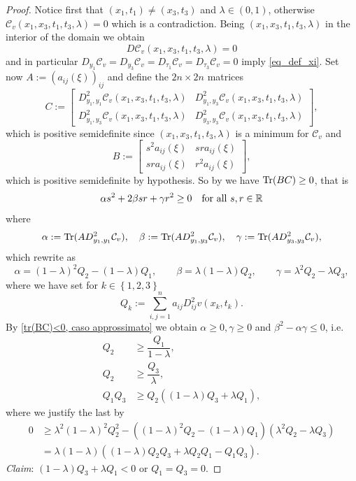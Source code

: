 \documentclass[11pt, reqno]{amsart}
\theoremstyle{definition}
\numberwithin{equation}{section}
\newcommand{\R}{\mathbb{R}}
\newcommand{\Tr}{{\rm Tr}}
\begin{document}
\begin{proof}
Notice first that $(x_1,t_1)\ne (x_3,t_3)$ and $\lambda\in (0,1)$, otherwise $\mathcal{C}_v(x_1,x_3,t_1,t_3,\lambda)=0$ which is a contradiction. 
Being $(x_1,x_3,t_1,t_3,\lambda)$ in the interior of the domain we obtain
			\[ D\mathcal{C}_v(x_1,x_3,t_1,t_3,\lambda)=0 \]
		and in particular $D_{y_1}\mathcal{C}_v = D_{y_3}\mathcal{C}_v = D_{\tau_1}\mathcal{C}_v = D_{\tau_3}\mathcal{C}_v = 0$ imply \eqref{eq_def_xi}. 
		Set now $A:=(a_{ij}(\xi))_{ij}$ and define the $2n\times 2n$ matrices 
		\[ C:= 
		\begin{bmatrix}
			D^2_{y_1, y_1}\mathcal{C}_v(x_1,x_3, t_1,t_3,\lambda) & 	 D^2_{y_1, y_3}\mathcal{C}_v(x_1,x_3, t_1,t_3,\lambda)\\
			D^2_{y_1, y_3}\mathcal{C}_v(x_1,x_3, t_1,t_3,\lambda) & 	 D^2_{y_3, y_3}\mathcal{C}_v(x_1,x_3, t_1,t_3,\lambda)
		\end{bmatrix}, \]
		which is positive semidefinite since $(x_1,x_3, t_1,t_3,\lambda)$ is a minimum for $\mathcal{C}_v$ and 
		\[ B:= \begin{bmatrix}
			s^2a_{ij}(\xi) & sra_{ij}(\xi) \\
			sra_{ij}(\xi) & r^2a_{ij}(\xi) 
		\end{bmatrix}, \]
		which is positive semidefinite by hypothesis. So by \cite[Lemma A.1]{kennington} we have $\Tr(BC)\geq 0$, that is
		\begin{equation}\label{tr(BC)<0, caso approssimato}
			\alpha s^2 +2\beta sr +\gamma r^2\geq 0 \quad \hbox{for all $s,r\in \R$} 
		\end{equation}
		where 
		\[ \alpha := \Tr (AD^2_{y_1,y_1}\mathcal{C}_v), \quad \beta:= \Tr (AD^2_{y_1,y_3}\mathcal{C}_v),\quad \gamma:= \Tr (AD^2_{y_3,y_3}\mathcal{C}_v),\]
		which rewrite as 
$$
				\alpha =(1-\lambda)^2Q_2-(1-\lambda)Q_1, \qquad \beta= \lambda(1-\lambda)Q_2, \qquad \gamma= \lambda^2Q_2-\lambda Q_3, 
$$
		where we have set for $k\in\left\{1,2,3\right\}$
		\[ Q_k:=\sum_{i,j=1}^na_{ij}D^2_{ij}v(x_k,t_k).\]
		By \eqref{tr(BC)<0, caso approssimato} we obtain $\alpha\geq0, \gamma\geq0$ and $\beta^2-\alpha \gamma\leq0$, i.e. 
		\begin{align}
			Q_2&\geq \dfrac{Q_1}{1-\lambda}\label{relation Q_1 II approssimato},\\
			Q_2&\geq \dfrac{Q_3}{\lambda}\label{relation Q_3 II approssimato},\\
			Q_1Q_3&\geq Q_2((1-\lambda)Q_3+\lambda Q_1)\label{relation Q_1Q_3 II approssimato},
		\end{align}
		where we justify the last by 
		\[
		\begin{split}
			0&\geq \lambda^2(1-\lambda)^2Q_2^2-((1-\lambda)^2Q_2-(1-\lambda)Q_1)(\lambda^2 Q_2-\lambda Q_3)\\
			& =\lambda(1-\lambda)((1-\lambda)Q_2Q_3+\lambda Q_2Q_1-Q_1Q_3).
		\end{split}
		\]
		\noindent\textit{Claim}: $(1-\lambda)Q_3+\lambda Q_1<0$ or $Q_1=Q_3=0$.
		

\end{proof}
\end{document}
